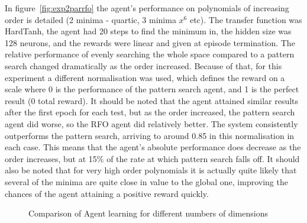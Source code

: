 In figure~\ref{fig:exp2parrfo} the agent's performance on polynomials of increasing order is detailed (2 minima - quartic, 3 minima $x^6$ etc). The transfer function was HardTanh, the agent had 20 steps to find the minimum in, the hidden size was 128 neurons, and the rewards were linear and given at episode termination.  The relative performance of evenly searching the whole space compared to a pattern search changed dramatically as the order increased. Because of that, for this experiment a different normalisation was used, which defines the reward on a scale where 0 is the performance of the pattern search agent, and 1 is the perfect result (0 total reward). It should be noted that the agent attained similar results after the first epoch for each test, but as the order increased, the pattern search agent did worse, so the RFO agent did relatively better. The system consistently outperforms the pattern search, arriving to around 0.85 in this normalisation in each case. This means that the agent's absolute performance does decrease as the order increases, but at 15\% of the rate at which pattern search falls off. It should also be noted that for very high order polynomials it is actually quite likely that several of the minima are quite close in value to the global one, improving the chances of the agent attaining a positive reward quickly.


\begin{figure}
\centering

\caption{Comparison of Agent learning for different numbers of dimensions}
\label{fig:exp2dimrfo}
\end{figure}

